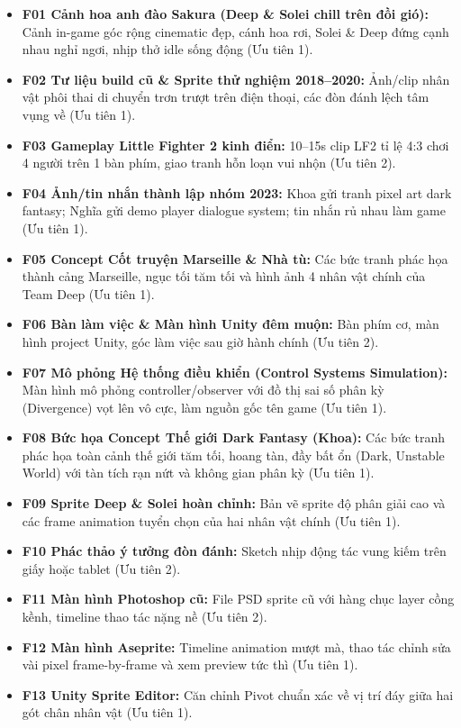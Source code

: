 \documentclass[11pt,a4paper]{article}
\newcommand{\tickbox}{\fbox{\rule{0pt}{0.75em}\hspace{0.75em}}}
\begin{document}
\begin{itemize}[label=\tickbox]
    \item \textbf{F01 Cảnh hoa anh đào Sakura (Deep \& Solei chill trên đồi gió):} Cảnh in-game góc rộng cinematic đẹp, cánh hoa rơi, Solei \& Deep đứng cạnh nhau nghỉ ngơi, nhịp thở idle sống động (Ưu tiên 1).
    \item \textbf{F02 Tư liệu build cũ \& Sprite thử nghiệm 2018–2020:} Ảnh/clip nhân vật phôi thai di chuyển trơn trượt trên điện thoại, các đòn đánh lệch tâm vụng về (Ưu tiên 1).
    \item \textbf{F03 Gameplay Little Fighter 2 kinh điển:} 10–15s clip LF2 tỉ lệ 4:3 chơi 4 người trên 1 bàn phím, giao tranh hỗn loạn vui nhộn (Ưu tiên 2).
    \item \textbf{F04 Ảnh/tin nhắn thành lập nhóm 2023:} Khoa gửi tranh pixel art dark fantasy; Nghĩa gửi demo player dialogue system; tin nhắn rủ nhau làm game (Ưu tiên 1).
    \item \textbf{F05 Concept Cốt truyện Marseille \& Nhà tù:} Các bức tranh phác họa thành cảng Marseille, ngục tối tăm tối và hình ảnh 4 nhân vật chính của Team Deep (Ưu tiên 1).
    \item \textbf{F06 Bàn làm việc \& Màn hình Unity đêm muộn:} Bàn phím cơ, màn hình project Unity, góc làm việc sau giờ hành chính (Ưu tiên 2).
    \item \textbf{F07 Mô phỏng Hệ thống điều khiển (Control Systems Simulation):} Màn hình mô phỏng controller/observer với đồ thị sai số phân kỳ (Divergence) vọt lên vô cực, làm nguồn gốc tên game (Ưu tiên 1).
    \item \textbf{F08 Bức họa Concept Thế giới Dark Fantasy (Khoa):} Các bức tranh phác họa toàn cảnh thế giới tăm tối, hoang tàn, đầy bất ổn (Dark, Unstable World) với tàn tích rạn nứt và không gian phân kỳ (Ưu tiên 1).
    \item \textbf{F09 Sprite Deep \& Solei hoàn chỉnh:} Bản vẽ sprite độ phân giải cao và các frame animation tuyển chọn của hai nhân vật chính (Ưu tiên 1).
    \item \textbf{F10 Phác thảo ý tưởng đòn đánh:} Sketch nhịp động tác vung kiếm trên giấy hoặc tablet (Ưu tiên 2).
    \item \textbf{F11 Màn hình Photoshop cũ:} File PSD sprite cũ với hàng chục layer cồng kềnh, timeline thao tác nặng nề (Ưu tiên 2).
    \item \textbf{F12 Màn hình Aseprite:} Timeline animation mượt mà, thao tác chỉnh sửa vài pixel frame-by-frame và xem preview tức thì (Ưu tiên 1).
    \item \textbf{F13 Unity Sprite Editor:} Căn chỉnh Pivot chuẩn xác về vị trí đáy giữa hai gót chân nhân vật (Ưu tiên 1).

\end{itemize}
\end{document}
